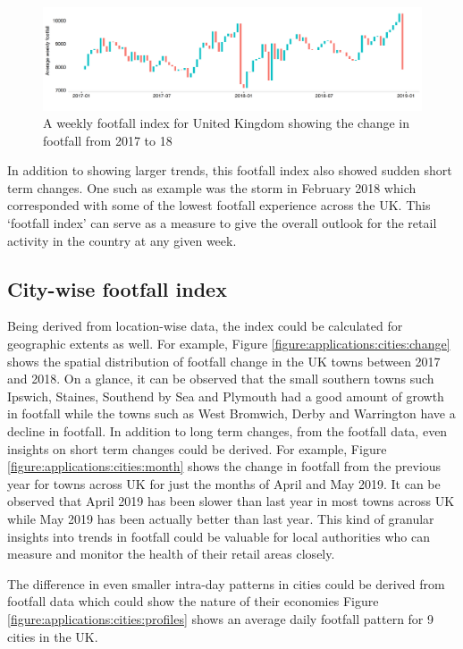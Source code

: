 \begin{figure}
  \includegraphics[trim={0 25 0 10},clip]{images/applications-footfall-index.png}
  \caption{A weekly footfall index for United Kingdom showing the change in footfall from 2017 to 18}
  \label{figure:applications:footfall:index}
\end{figure}

In addition to showing larger trends, this footfall index also showed sudden short term changes. 
One such as example was the storm in February 2018 which corresponded with some of the lowest footfall experience across the UK.
This `footfall index' can serve as a measure to give the overall outlook for the 
retail activity in the country at any given week.

\subsection{City-wise footfall index}

Being derived from location-wise data, the index could be calculated for geographic extents as well.
For example, Figure \ref{figure:applications:cities:change} shows the spatial distribution of footfall change in the UK towns between 2017 and 2018.
On a glance, it can be observed that the small southern towns such Ipswich, Staines, Southend by Sea and Plymouth had a good amount of growth in footfall while the towns such as West Bromwich, Derby and Warrington have a decline in footfall.
In addition to long term changes, from the footfall data, even insights on short term changes could be derived.
For example, Figure \ref{figure:applications:cities:month} shows the change in footfall from the previous year for towns across UK for just the months of April and May 2019.
It can be observed that April 2019 has been slower than last year in most towns across UK while May 2019 has been actually better than last year.
This kind of granular insights into trends in footfall could be valuable for local authorities who can measure and monitor the health of their retail areas closely.

The difference in even smaller intra-day patterns in cities could be derived from footfall data which could show the nature of their economies
Figure \ref{figure:applications:cities:profiles} shows an average daily footfall pattern for 9 cities in the UK.

